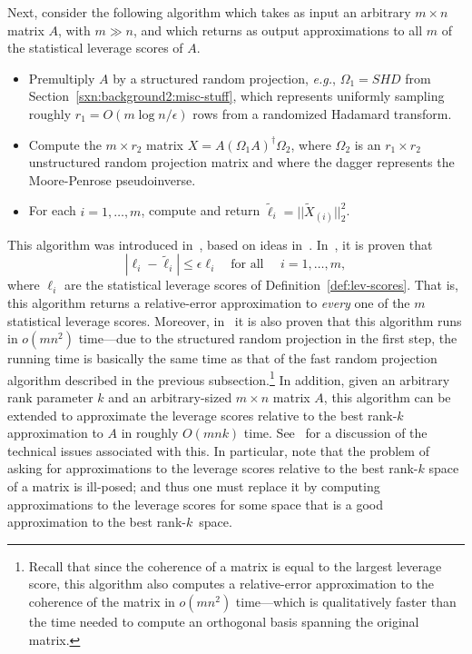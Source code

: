 \documentclass[twoside]{article}
\begin{document}
Next, consider the following algorithm which takes as input an arbitrary 
$m \times n$ matrix $A$, with $m \gg n$, and which returns as output
approximations to all $m$ of the statistical leverage scores of $A$.
\begin{itemize}
\item
Premultiply $A$ by a structured random projection, \emph{e.g.}, 
$\Omega_1 = S H D$ from Section~\ref{sxn:background2:misc-stuff}, which 
represents uniformly sampling roughly $r_1=O(m \log n /\epsilon)$ rows from 
a randomized Hadamard transform.
\item
Compute the $m \times r_2$ matrix $X = A (\Omega_1 A )^{\dagger} \Omega_2 $, 
where $\Omega_2$ is an $r_1 \times r_2$ unstructured random projection matrix 
and where the dagger represents the Moore-Penrose pseudoinverse.
\item
For each $i = 1,\ldots,m$,
compute and return $\tilde{\ell}_i = ||\tilde{X}_{(i)}||_2^2$.
\end{itemize}
This algorithm was introduced in~\cite{DMMW11_TR}, based 
on ideas in~\cite{Malik10_TR}.
In~\cite{DMMW11_TR}, it is proven that 
$$
|\ell_i- \tilde{\ell}_i | \le \epsilon \ell_i 
\quad 
\mbox{for all } 
\quad 
i = 1,\ldots,m   ,
$$
where $\ell_i$
are the statistical leverage scores of Definition~\ref{def:lev-scores}.
That is, this algorithm returns a relative-error 
approximation to \emph{every} one of the $m$ statistical leverage scores.
Moreover, in~\cite{DMMW11_TR} it is also proven that this algorithm runs in 
$o(mn^2)$ time---due to the structured random projection in the first step, 
the running time is basically the same time as that of the fast random projection 
algorithm described in the previous subsection.\footnote{Recall that since the coherence of a matrix is equal 
to the largest leverage score, this algorithm also computes a relative-error
approximation to the coherence of the matrix in $o(mn^2)$ time---which 
is qualitatively faster than the time needed to compute an orthogonal basis
spanning the original matrix.} 
In addition, given an arbitrary rank parameter $k$ and an arbitrary-sized 
$m \times n$ matrix $A$, this algorithm can be extended to approximate the 
leverage scores relative to the best rank-$k$ approximation to $A$ in 
roughly $O(mn k)$ time.
See~\cite{DMMW11_TR} for a discussion of the technical issues associated 
with this.  In particular, note that the problem of asking for approximations 
to the leverage scores relative to the best rank-$k$ space of a matrix is 
ill-posed; and thus one must replace it by computing approximations to the 
leverage scores for some space that is a good approximation to the best 
rank-$k$~space.
\end{document}
